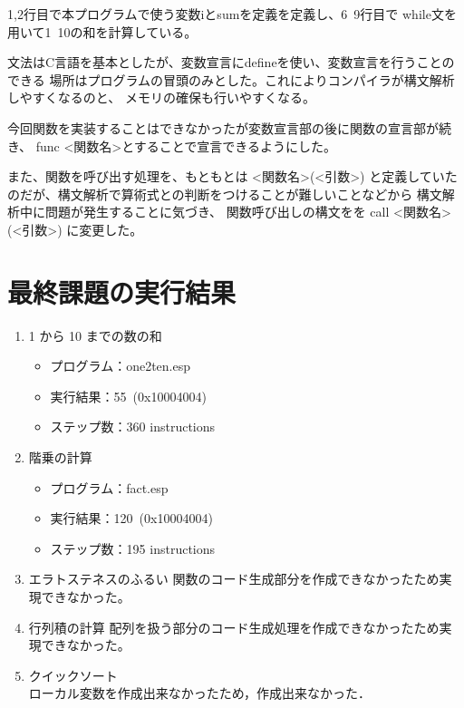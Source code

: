 \documentclass[11pt,a4j]{jarticle}
\begin{document}
\vspace{0.2in}

1,2行目で本プログラムで使う変数iとsumを定義を定義し、6~9行目で
while文を用いて1~10の和を計算している。


文法はC言語を基本としたが、変数宣言にdefineを使い、変数宣言を行うことのできる
場所はプログラムの冒頭のみとした。これによりコンパイラが構文解析しやすくなるのと、
メモリの確保も行いやすくなる。

\vspace{0.2in}

今回関数を実装することはできなかったが変数宣言部の後に関数の宣言部が続き、
func <関数名>とすることで宣言できるようにした。

また、関数を呼び出す処理を、もともとは <関数名>(<引数>) 
と定義していたのだが、構文解析で算術式との判断をつけることが難しいことなどから
構文解析中に問題が発生することに気づき、
関数呼び出しの構文をを call <関数名>(<引数>) に変更した。



\section{最終課題の実行結果} %

\begin{enumerate}
\item {1 から 10 までの数の和 }
  \begin{itemize}
  \item
    プログラム：one2ten.esp
  \item
    実行結果：55~(0x10004004)
  \item
    ステップ数：360 instructions 
  \end{itemize}
\item {階乗の計算}
  \begin{itemize}
  \item
    プログラム：fact.esp
  \item
    実行結果：120~(0x10004004) %
  \item
    ステップ数：195 instructions %
  \end{itemize}
\item {エラトステネスのふるい}
  関数のコード生成部分を作成できなかったため実現できなかった。
\item {行列積の計算}
  配列を扱う部分のコード生成処理を作成できなかったため実現できなかった。
\item {クイックソート}\\
  ローカル変数を作成出来なかったため，作成出来なかった．
\end{enumerate}
\end{document}
